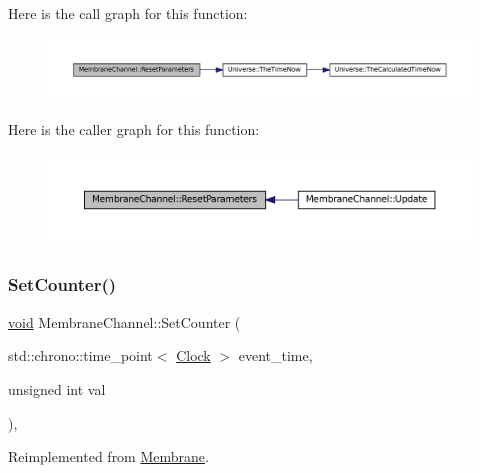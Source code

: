 Here is the call graph for this function\+:\nopagebreak
\begin{figure}[H]
\begin{center}
\leavevmode
\includegraphics[width=350pt]{class_membrane_channel_a5982040b46efe5e2b824d1cf4dead25e_cgraph}
\end{center}
\end{figure}
Here is the caller graph for this function\+:\nopagebreak
\begin{figure}[H]
\begin{center}
\leavevmode
\includegraphics[width=350pt]{class_membrane_channel_a5982040b46efe5e2b824d1cf4dead25e_icgraph}
\end{center}
\end{figure}
\mbox{\label{class_membrane_channel_a61931feff8f3bb485eeb5c80125bb732}} 
\subsubsection{\texorpdfstring{Set\+Counter()}{SetCounter()}}
{\footnotesize\ttfamily \mbox{\hyperlink{glad_8h_a950fc91edb4504f62f1c577bf4727c29}{void}} Membrane\+Channel\+::\+Set\+Counter (\begin{DoxyParamCaption}\item[{std\+::chrono\+::time\+\_\+point$<$ \mbox{\hyperlink{universe_8h_a0ef8d951d1ca5ab3cfaf7ab4c7a6fd80}{Clock}} $>$}]{event\+\_\+time,  }\item[{unsigned int}]{val }\end{DoxyParamCaption})\hspace{0.3cm}{\ttfamily [inline]}, {\ttfamily [virtual]}}



Reimplemented from \mbox{\hyperlink{class_membrane_a4bff43b38d7046867f220392a39cc272}{Membrane}}.



